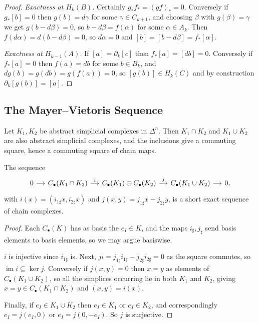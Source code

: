 \documentclass[a4paper]{scrartcl}
\begin{document}
\begin{proof}
	\emph{Exactness at $H_k(B)$.} Certainly $g_*f_* = (gf)_* = 0$. Conversely if $g_*[b] = 0$ then $g(b) = d\gamma$ for some $\gamma \in C_{k+1}$, and choosing $\beta$ with $g(\beta) = \gamma$ we get $g(b - d\beta) = 0$, so $b - d\beta = f(\alpha)$ for some $\alpha \in A_k$. Then $f(d\alpha) = d(b-d\beta) = 0$, so $d\alpha = 0$ and $[b] = [b - d\beta] = f_*[\alpha]$.

	\emph{Exactness at $H_{k-1}(A)$.} If $[a] = \partial_k[c]$ then $f_*[a] = [db] = 0$. Conversely if $f_*[a] = 0$ then $f(a) = db$ for some $b \in B_k$, and $dg(b) = g(db) = g(f(a)) = 0$, so $[g(b)] \in H_k(C)$ and by construction $\partial_k[g(b)] = [a]$.
\end{proof}

\subsection{The Mayer--Vietoris Sequence}

Let $K_1, K_2$ be abstract simplicial complexes in $\Delta^n$. Then $K_1\cap K_2$ and
$K_1 \cup K_2$ are also abstract simplicial complexes, and the inclusions give a
commuting square, hence a commuting square of chain maps.

\begin{proposition} \label{prop:mv-ses}
	The sequence
	\[\begin{tikzcd}[column sep=small]
		0 \arrow[r] & {C_\bullet(K_1\cap K_2)} \arrow[r, "i"] & {C_\bullet(K_1)\oplus C_\bullet(K_2)} \arrow[r, "j"] & {C_\bullet(K_1\cup K_2)} \arrow[r] & 0,
	\end{tikzcd}\]
	with $i(x) = (i_{1\sharp}x, i_{2\sharp}x)$ and $j(x,y) = j_{1\sharp}x - j_{2\sharp}y$, is a short exact sequence of chain complexes.
\end{proposition}
\begin{proof}
	Each $C_\bullet(K)$ has as basis the $e_I \in K$, and the maps $i_\sharp, j_\sharp$ send basis elements to basis elements, so we may argue basiswise.

	$i$ is injective since $i_{1\sharp}$ is. Next, $ji = j_{1\sharp}i_{1\sharp} - j_{2\sharp}i_{2\sharp} = 0$ as the square commutes, so $\operatorname{im}i \subseteq \ker j$. Conversely if $j(x,y) = 0$ then $x = y$ as elements of $C_\bullet(K_1\cup K_2)$, so all the simplices occurring lie in both $K_1$ and $K_2$, giving $x = y \in C_\bullet(K_1\cap K_2)$ and $(x,y) = i(x)$.

	Finally, if $e_I \in K_1\cup K_2$ then $e_I \in K_1$ or $e_I \in K_2$, and correspondingly $e_I = j(e_I, 0)$ or $e_I = j(0,-e_I)$. So $j$ is surjective.
\end{proof}
\end{document}
